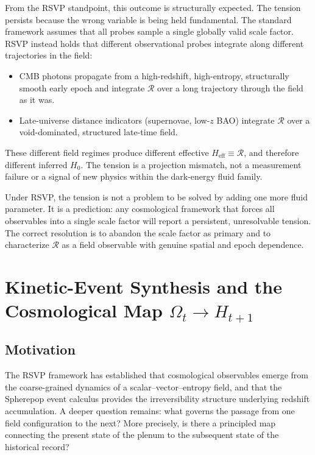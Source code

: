 \documentclass[12pt,a4paper]{article}
\theoremstyle{remark}
\newcommand{\Rcal}{\mathcal{R}}
\newcommand{\Heff}{H_{\mathrm{eff}}}
\begin{document}
From the RSVP standpoint, this outcome is structurally expected. The tension persists because the wrong variable is being held fundamental. The standard framework assumes that all probes sample a single globally valid scale factor. RSVP instead holds that different observational probes integrate along different trajectories in the field:
\begin{itemize}[leftmargin=2em]
\item CMB photons propagate from a high-redshift, high-entropy, structurally smooth early epoch and integrate $\Rcal$ over a long trajectory through the field as it was.
\item Late-universe distance indicators (supernovae, low-$z$ BAO) integrate $\Rcal$ over a void-dominated, structured late-time field.
\end{itemize}
These different field regimes produce different effective $\Heff \equiv \Rcal$, and therefore different inferred $H_0$. The tension is a projection mismatch, not a measurement failure or a signal of new physics within the dark-energy fluid family.

Under RSVP, the tension is not a problem to be solved by adding one more fluid parameter. It is a prediction: any cosmological framework that forces all observables into a single scale factor will report a persistent, unresolvable tension. The correct resolution is to abandon the scale factor as primary and to characterize $\Rcal$ as a field observable with genuine spatial and epoch dependence.


\section{Kinetic-Event Synthesis and the Cosmological Map $\Omega_t \to H_{t+1}$}
\label{sec:kes}

\subsection{Motivation}

The RSVP framework has established that cosmological observables emerge from
the coarse-grained dynamics of a scalar--vector--entropy field, and that the
Spherepop event calculus provides the irreversibility structure underlying
redshift accumulation. A deeper question remains: what governs the passage
from one field configuration to the next? More precisely, is there a
principled map connecting the present state of the plenum to the subsequent
state of the historical record?
\end{document}
